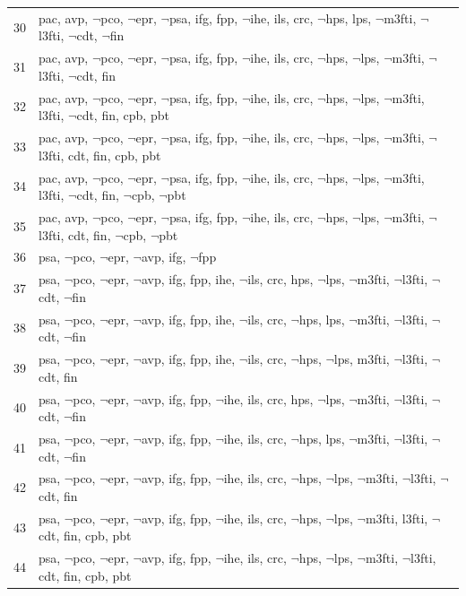 \documentclass{IOS-Book-Article}
\begin{document}
\begin{longtable}{p{5mm}p{115mm}}
30	& pac, avp, $\neg$pco, $\neg$epr, $\neg$psa, ifg, fpp, $\neg$ihe, ils, crc, $\neg$hps, lps, $\neg$m3fti, $\neg$l3fti, $\neg$cdt, $\neg$fin \\
31	& pac, avp, $\neg$pco, $\neg$epr, $\neg$psa, ifg, fpp, $\neg$ihe, ils, crc, $\neg$hps, $\neg$lps, $\neg$m3fti, $\neg$l3fti, $\neg$cdt, fin \\
32	& pac, avp, $\neg$pco, $\neg$epr, $\neg$psa, ifg, fpp, $\neg$ihe, ils, crc, $\neg$hps, $\neg$lps, $\neg$m3fti, l3fti, $\neg$cdt, fin, cpb, pbt \\
33	& pac, avp, $\neg$pco, $\neg$epr, $\neg$psa, ifg, fpp, $\neg$ihe, ils, crc, $\neg$hps, $\neg$lps, $\neg$m3fti, $\neg$l3fti, cdt, fin, cpb, pbt \\
34	& pac, avp, $\neg$pco, $\neg$epr, $\neg$psa, ifg, fpp, $\neg$ihe, ils, crc, $\neg$hps, $\neg$lps, $\neg$m3fti, l3fti, $\neg$cdt, fin, $\neg$cpb, $\neg$pbt \\
35	& pac, avp, $\neg$pco, $\neg$epr, $\neg$psa, ifg, fpp, $\neg$ihe, ils, crc, $\neg$hps, $\neg$lps, $\neg$m3fti, $\neg$l3fti, cdt, fin, $\neg$cpb, $\neg$pbt \\
36	& psa, $\neg$pco, $\neg$epr, $\neg$avp, ifg, $\neg$fpp \\
37	& psa, $\neg$pco, $\neg$epr, $\neg$avp, ifg, fpp, ihe, $\neg$ils, crc, hps, $\neg$lps, $\neg$m3fti, $\neg$l3fti, $\neg$cdt, $\neg$fin \\
38	& psa, $\neg$pco, $\neg$epr, $\neg$avp, ifg, fpp, ihe, $\neg$ils, crc, $\neg$hps, lps, $\neg$m3fti, $\neg$l3fti, $\neg$cdt, $\neg$fin \\
39	& psa, $\neg$pco, $\neg$epr, $\neg$avp, ifg, fpp, ihe, $\neg$ils, crc, $\neg$hps, $\neg$lps, m3fti, $\neg$l3fti, $\neg$cdt, fin \\
40	& psa, $\neg$pco, $\neg$epr, $\neg$avp, ifg, fpp, $\neg$ihe, ils, crc, hps, $\neg$lps, $\neg$m3fti, $\neg$l3fti, $\neg$cdt, $\neg$fin \\
41	& psa, $\neg$pco, $\neg$epr, $\neg$avp, ifg, fpp, $\neg$ihe, ils, crc, $\neg$hps, lps, $\neg$m3fti, $\neg$l3fti, $\neg$cdt, $\neg$fin \\
42	& psa, $\neg$pco, $\neg$epr, $\neg$avp, ifg, fpp, $\neg$ihe, ils, crc, $\neg$hps, $\neg$lps, $\neg$m3fti, $\neg$l3fti, $\neg$cdt, fin \\
43	& psa, $\neg$pco, $\neg$epr, $\neg$avp, ifg, fpp, $\neg$ihe, ils, crc, $\neg$hps, $\neg$lps, $\neg$m3fti, l3fti, $\neg$cdt, fin, cpb, pbt \\
44	& psa, $\neg$pco, $\neg$epr, $\neg$avp, ifg, fpp, $\neg$ihe, ils, crc, $\neg$hps, $\neg$lps, $\neg$m3fti, $\neg$l3fti, cdt, fin, cpb, pbt \\ 

\end{longtable}
\end{document}
